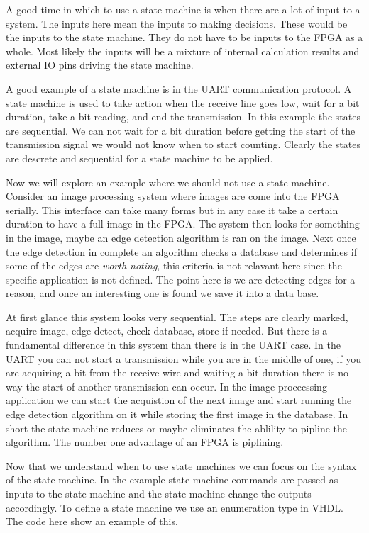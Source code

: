 A good time in which to use a state machine is when there are a lot of input to a system. The inputs here mean the inputs to making decisions. These would be the inputs to the state machine. They do not have to be inputs to the \ac{FPGA} as a whole. Most likely the inputs will be a mixture of internal calculation results and external \ac{IO} pins driving the state machine. 

A good example of a state machine is in the \ac{UART} communication protocol. A state machine is used to take action when the receive line goes low, wait for a bit duration, take a bit reading, and end the transmission. In this example the states are sequential. We can not wait for a bit duration before getting the start of the transmission signal we would not know when to start counting. Clearly the states are descrete and sequential for a state machine to be applied. 

Now we will explore an example where we should not use a state machine. Consider an image processing system where images are come into the \ac{FPGA} serially. This interface can take many forms but in any case it take a certain duration to have a full image in the \ac{FPGA}. The system then looks for something in the image, maybe an edge detection algorithm is ran on the image. Next once the edge detection in complete an algorithm checks a database and determines if some of the edges are \emph{worth noting}, this criteria is not relavant here since the specific application is not defined. The point here is we are detecting edges for a reason, and once an interesting one is found we save it into a data base. 

At first glance this system looks very sequential. The steps are clearly marked, acquire image, edge detect, check database, store if needed. But there is a fundamental difference in this system than there is in the \ac{UART} case. In the \ac{UART} you can not start a transmission while you are in the middle of one, if you are acquiring a bit from the receive wire and waiting a bit duration there is no way the start of another transmission can occur. In the image procecssing application we can start the acquistion of the next image and start running the edge detection algorithm on it while storing the first image in the database. In short the state machine reduces or maybe eliminates the ablility to pipline the algorithm. The number one advantage of an \ac{FPGA} is piplining.

Now that we understand when to use state machines we can focus on the syntax of the state machine. In the example state machine commands are passed as inputs to the state machine and the state machine change the outputs accordingly. To define a state machine we use an enumeration type in \ac{VHDL}. The code here show an example of this. 

